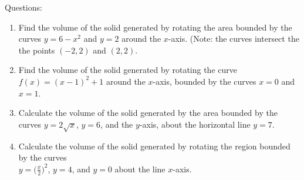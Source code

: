 \documentclass[16pt]{article}
\theoremstyle{remark}
\begin{document}
Questions:
\begin{enumerate}
\item Find the volume of the solid generated by rotating the area bounded by the curves $y=6-x^2$ and $y=2$ around the $x$-axis. (Note: the curves intersect the the points $(-2,2)$ and $(2,2)$.
\newpage
\item Find the volume of the solid generated by rotating the curve $f(x) = (x-1)^2+1$ around the $x$-axis, bounded by the curves $x=0$ and $x=1$.
\newpage
\item Calculate the volume of the solid generated by the area bounded by the curves $y=2\sqrt{x}$, $y=6$, and the $y$-axis, about the horizontal line $y=7$.
\newpage\item Calculate the volume of the solid generated by rotating the region bounded by the curves\\ $\displaystyle{y=\bigg(\frac{x}{2}\bigg)^2}$, $y=4$, and $y=0$ about the line $x$-axis.
\end{enumerate}
\end{document}
